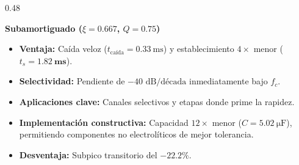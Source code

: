 \begin{frame}
\begin{columns}[t, onlytextwidth]
    \begin{column}{0.48\textwidth}
      \begin{tarjeta}[colframe=BlueAccent, top=4pt, bottom=4pt]
        {\fontsize{8.5pt}{10pt}\selectfont \textbf{\color{BlueAccent} Subamortiguado ($\xi = 0.667$, $Q = 0.75$)}}\\[2pt]
        {\fontsize{7.2pt}{8.8pt}\selectfont
        \begin{itemize}\setlength{\itemsep}{1.5pt}
          \item \textbf{Ventaja:} Caída veloz ($t_{\text{caída}} = \qty{0.33}{\milli\second}$) y establecimiento $4\times$ menor ($t_s = \mathbf{\qty{1.82}{\milli\second}}$).
          \item \textbf{Selectividad:} Pendiente de $-40\text{ dB/década}$ inmediatamente bajo $f_c$.
          \item \textbf{Aplicaciones clave:} Canales selectivos y etapas donde prime la rapidez.
          \item \textbf{Implementación constructiva:} Capacidad $12\times$ menor ($C = \qty{5.02}{\micro\farad}$), permitiendo componentes no electrolíticos de mejor tolerancia.
          \item \textbf{Desventaja:} Subpico transitorio del $\mathbf{-22.2\%}$.
        \end{itemize}
        }
      \end{tarjeta}
    \end{column}
  \end{columns}
\end{frame}

